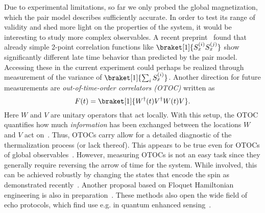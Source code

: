 Due to experimental limitations, so far we only probed the global magnetization, which the pair model describes sufficiently accurate. In order to test its range of validity and shed more light on the properties of the system, it would be interesting to study more complex observables. A recent preprint~\cite{mukherjeeInfluenceDisorderedAnisotropic2024} found that already simple 2-point correlation functions like $\braket[1]{S_x^{(i)}S_x^{(j)}}$ show significantly different late time behavior than predicted by the pair model. Accessing these in the current experiment could perhaps be realized through measurement of the variance of $\braket[1]{\sum_i S_x^{(i)}}$.
Another direction for future measurements are \emph{out-of-time-order correlators (OTOC)} written as
\begin{equation}
	F(t) = \braket[1]{W^\dagger(t)V^\dagger W(t)V}.
\end{equation}
Here $W$ and $V$ are unitary operators that act locally. With this setup, the OTOC quantifies how much \emph{information} has been exchanged between the locations $W$ and $V$ act on~\cite{chenOutTimeOrder2017,swingleUnscramblingPhysicsOutoftimeorder2018,luitzEmergentLocalitySystems2019,xuScramblingDynamicsOutofTimeOrdered2024}. Thus, OTOCs carry allow for a detailed diagnostic of the thermalization process (or lack thereof). This appears to be true even for OTOCs of global observables~\cite{lozano-negroGlobalOutTime2024}. However, measuring OTOCs is not an easy task since they generally require reversing the arrow of time for the system. While involved, this can be achieved robustly by changing the states that encode the spin as demonstrated recently~\cite{geierTimereversalDipolarQuantum2024}. Another proposal based on Floquet Hamiltonian engineering is also in preparation~\cite{muellenbachOTOC}. 
These methods also open the wide field of echo protocols, which find use e.g. in quantum enhanced sensing~\cite{davisApproachingHeisenbergLimit2016,linnemannQuantumEnhancedSensingBased2016,colomboTimereversalbasedQuantumMetrology2022}.

